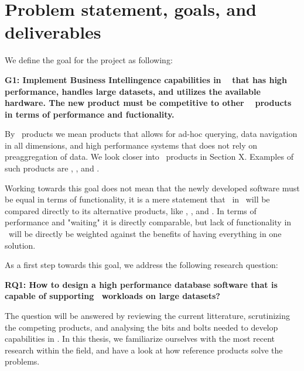 \section{Problem statement, goals, and deliverables}
\label{sec:problem-statement-and-goals}

We define the goal for the project as following: 

\textbf{G1: Implement Business Intellingence capabilities in \genusSoftware~ that has high performance, handles large datasets, and utilizes the available hardware. The new product must be competitive to other \bd~ products in terms of performance and fuctionality.}

By \bd~products we mean products that allows for ad-hoc querying, data navigation in all dimensions, and high performance systems that does not rely on preaggregation of data. We look closer into \bd~products in Section X. Examples of such products are \qlikview, \tableau, and \powerpivot.

Working towards this goal does not mean that the newly developed software must be equal in terms of functionality, it is a mere statement that \bi~in \genusSoftware~will be compared directly to its alternative products, like \qlikview, \tableau, and \powerpivot. In terms of performance and "waiting" it is directly comparable, but lack of functionality in \genusSoftware~will be directly be weighted against the benefits of having everything in one solution.

As a first step towards this goal, we address the following research question:

\textbf{RQ1: How to design a high performance database software that is capable of supporting \bd~workloads on large datasets?} 

The question will be answered by reviewing the current litterature, scrutinizing the competing products, and analysing the bits and bolts needed to develop \bi~ capabilities in \genusSoftware. In this thesis, we familiarize ourselves with the most recent research within the field, and have a look at how reference products solve the problems. 

